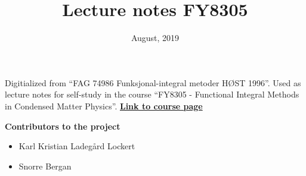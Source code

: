 \documentclass{article}
\title{Lecture notes FY8305}
\date{August, 2019}
\theoremstyle{definition}
\newcommand{\contribs}{%
\begin{center}
\Large 
\textbf{Contributors to the project}
\end{center}


\begin{itemize}
\item Karl Kristian Ladegård Lockert
\item Snorre Bergan
\end{itemize}

}
\begin{document}
\maketitle
Digitialized from ``FAG 74986 Funksjonal-integral metoder HØST 1996''.
Used as lecture notes for self-study in the course ``FY8305 - Functional Integral Methods in Condensed Matter Physics''. \href{https://www.ntnu.edu/studies/courses/FY8305}{\textbf{Link to course page}}
\contribs
\tableofcontents















\end{document}
